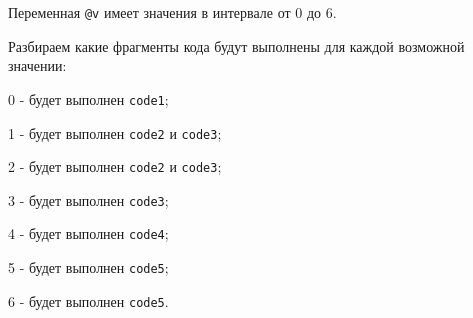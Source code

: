 Переменная \texttt{@v} имеет значения в интервале от 0 до 6.

Разбираем какие фрагменты кода будут выполнены для каждой возможной значении:
\begin{icItems}
	\item 0 - будет выполнен \texttt{code1};
	\item 1 - будет выполнен \texttt{code2} и \texttt{code3};
	\item 2 - будет выполнен \texttt{code2} и \texttt{code3};
	\item 3 - будет выполнен \texttt{code3};
	\item 4 - будет выполнен \texttt{code4};
	\item 5 - будет выполнен \texttt{code5};
	\item 6 - будет выполнен \texttt{code5}.
\end{icItems}

